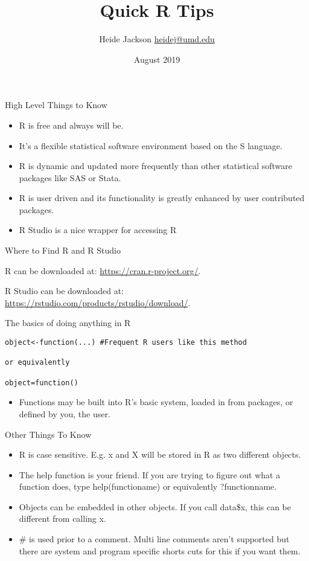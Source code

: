 \documentclass{beamer}
\title{Quick R Tips}
\author{\texorpdfstring{Heide Jackson \newline\url{heidej@umd.edu}}{Author}}
\institute{University of Maryland Population Research Center}
\date{August 2019}
\begin{document}
\maketitle
\begin{frame}{High Level Things to Know}
\begin{itemize}
\item R is free and always will be.
\item It's a flexible statistical software environment based on the S language.
\item R is dynamic and updated more frequently than other statistical software packages like SAS or Stata.
\item R is user driven and its functionality is greatly enhanced by user contributed packages.
\item R Studio is a nice wrapper for accessing R
\end{itemize}
\end{frame}


\begin{frame}{Where to Find R and R Studio}

\item R can be downloaded at: \url{https://cran.r-project.org/}.

\item R Studio can be downloaded at: \url{https://rstudio.com/products/rstudio/download/}.

\end{frame}

\begin{frame}[fragile]{The basics of doing anything in R}
\begin{verbatim}
object<-function(...) #Frequent R users like this method

or equivalently

object=function()
\end{verbatim}
\begin{itemize}
    \item Functions may be built into R's basic system, loaded in from packages, or defined by you, the user.
\end{itemize}
\end{frame}

\begin{frame}{Other Things To Know}
\begin{itemize}
    \item R is case sensitive. E.g. x and X will be stored in R as two different objects.
    \item The help function is your friend.  If you are trying to figure out what a function does, type help(functioname) or equivalently ?functionname.
    \item Objects can be embedded in other objects.  If you call data\$x, this can be different from calling x.
   \item \# is used prior to a comment.  Multi line comments aren't supported but there are system and program specific shorts cuts for this if you want them.
    \end{itemize}
    \end{frame}
\end{document}

